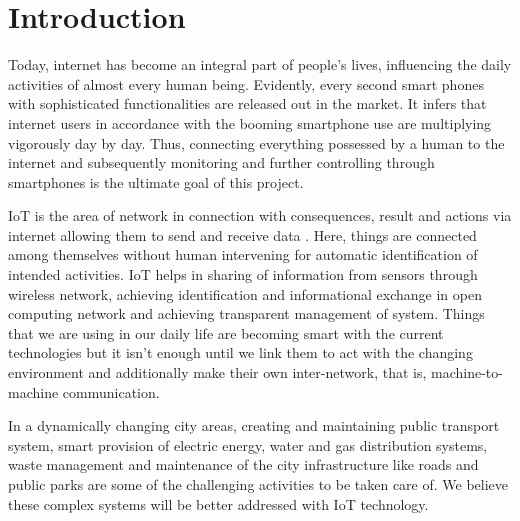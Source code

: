 \documentclass[journal,twoside]{IEEEtran}
\begin{document}
%
\IEEEpeerreviewmaketitle



\section{Introduction}
Today, internet has become an integral part of people's
lives, influencing the daily activities of almost every human
being. Evidently, every second smart phones with
sophisticated functionalities are released out in the market. It
infers that internet users in accordance with the booming
smartphone use are multiplying vigorously day by day. Thus,
connecting everything possessed by a human to the internet and
subsequently monitoring and further controlling through
smartphones is the ultimate goal of this project.

IoT is the area of network in connection with
consequences, result and actions via internet allowing them to
send and receive data \cite{Floerkemeier2008}. Here, things are connected among
themselves without human intervening for automatic
identification of intended activities. IoT helps in sharing of
information from sensors through wireless network, achieving
identification and informational exchange in open computing
network and achieving transparent management of system.
Things that we are using in our daily life are becoming smart
with the current technologies but it isn’t enough until we link
them to act with the changing environment and additionally
make their own inter-network, that is, machine-to-machine
communication.\cite{Floerkemeier2008}

In a dynamically changing city areas, creating and
maintaining public transport system, smart provision of electric
energy, water and gas distribution systems, waste management
and maintenance of the city infrastructure like roads and public
parks are some of the challenging activities to be taken care of.
We believe these complex systems will be better addressed with
IoT technology.
\end{document}
